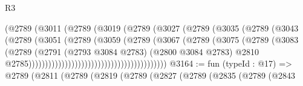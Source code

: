 \begin{lexlean}{R3}
\begin{coremodule}
                                            (@2789
                                              (@3011
                                                (@2789
                                                  (@3019
                                                    (@2789
                                                      (@3027
                                                        (@2789
                                                          (@3035
                                                            (@2789
                                                              (@3043
                                                                (@2789
                                                                  (@3051
                                                                    (@2789
                                                                      (@3059
                                                                        (@2789
                                                                          (@3067
                                                                            (@2789
                                                                              (@3075
                                                                                (@2789
                                                                                  (@3083
                                                                                    (@2789
                                                                                      (@2791
                                                                                        (@2793
                                                                                          @3084
                                                                                          @2783)
                                                                                        (@2800
                                                                                          @3084
                                                                                          @2783)
                                                                                        @2810
                                                                                        @2785))))))))))))))))))))))))))))))))))))))))))
@3164 := fun (typeId : @17) =>
  @2789
    (@2811
      (@2789
        (@2819
          (@2789
            (@2827
              (@2789
                (@2835
                  (@2789
                    (@2843

\end{coremodule}
\end{lexlean}

